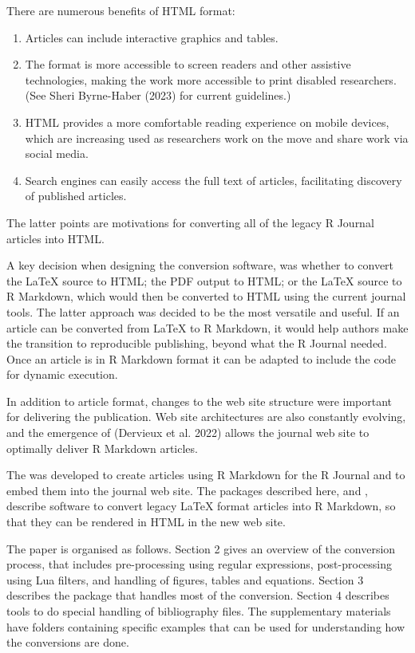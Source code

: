 There are numerous benefits of HTML format:

\begin{enumerate}
\def\labelenumi{\arabic{enumi}.}
\tightlist
\item
  Articles can include interactive graphics and tables.
\item
  The format is more accessible to screen readers and other assistive technologies, making the work more accessible to print disabled researchers. (See Sheri Byrne-Haber (2023) for current guidelines.)
\item
  HTML provides a more comfortable reading experience on mobile devices, which are increasing used as researchers work on the move and share work via social media.
\item
  Search engines can easily access the full text of articles, facilitating discovery of published articles.
\end{enumerate}

The latter points are motivations for converting all of the legacy R Journal articles into HTML.

A key decision when designing the conversion software, was whether to convert the LaTeX source to HTML; the PDF output to HTML; or the LaTeX source to R Markdown, which would then be converted to HTML using the current journal tools. The latter approach was decided to be the most versatile and useful. If an article can be converted from LaTeX to R Markdown, it would help authors make the transition to reproducible publishing, beyond what the R Journal needed. Once an article is in R Markdown format it can be adapted to include the code for dynamic execution.

In addition to article format, changes to the web site structure were important for delivering the publication. Web site architectures are also constantly evolving, and the emergence of  (Dervieux et al. 2022) allows the journal web site to optimally deliver R Markdown articles.

The  was developed to create articles using R Markdown for the R Journal and to embed them into the journal web site. The packages described here,  and , describe software to convert legacy LaTeX format articles into R Markdown, so that they can be rendered in HTML in the new web site.

The paper is organised as follows. Section 2 gives an overview of the conversion process, that includes pre-processing using regular expressions, post-processing using Lua filters, and handling of figures, tables and equations. Section 3 describes the  package that handles most of the conversion. Section 4 describes tools to do special handling of bibliography files. The supplementary materials have folders containing specific examples that can be used for understanding how the conversions are done.

